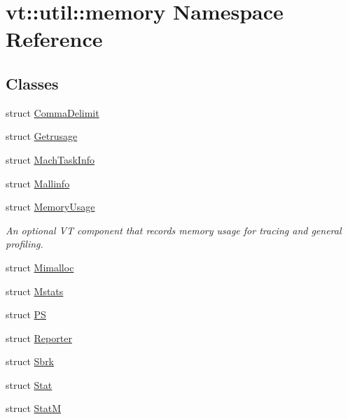 \hypertarget{namespacevt_1_1util_1_1memory}{}\section{vt\+:\+:util\+:\+:memory Namespace Reference}
\label{namespacevt_1_1util_1_1memory}
\subsection*{Classes}
\begin{DoxyCompactItemize}
\item 
struct \hyperlink{structvt_1_1util_1_1memory_1_1_comma_delimit}{Comma\+Delimit}
\item 
struct \hyperlink{structvt_1_1util_1_1memory_1_1_getrusage}{Getrusage}
\item 
struct \hyperlink{structvt_1_1util_1_1memory_1_1_mach_task_info}{Mach\+Task\+Info}
\item 
struct \hyperlink{structvt_1_1util_1_1memory_1_1_mallinfo}{Mallinfo}
\item 
struct \hyperlink{structvt_1_1util_1_1memory_1_1_memory_usage}{Memory\+Usage}
\begin{DoxyCompactList}\small\item\em An optional VT component that records memory usage for tracing and general profiling. \end{DoxyCompactList}\item 
struct \hyperlink{structvt_1_1util_1_1memory_1_1_mimalloc}{Mimalloc}
\item 
struct \hyperlink{structvt_1_1util_1_1memory_1_1_mstats}{Mstats}
\item 
struct \hyperlink{structvt_1_1util_1_1memory_1_1_p_s}{PS}
\item 
struct \hyperlink{structvt_1_1util_1_1memory_1_1_reporter}{Reporter}
\item 
struct \hyperlink{structvt_1_1util_1_1memory_1_1_sbrk}{Sbrk}
\item 
struct \hyperlink{structvt_1_1util_1_1memory_1_1_stat}{Stat}
\item 
struct \hyperlink{structvt_1_1util_1_1memory_1_1_stat_m}{StatM}
\end{DoxyCompactItemize}
